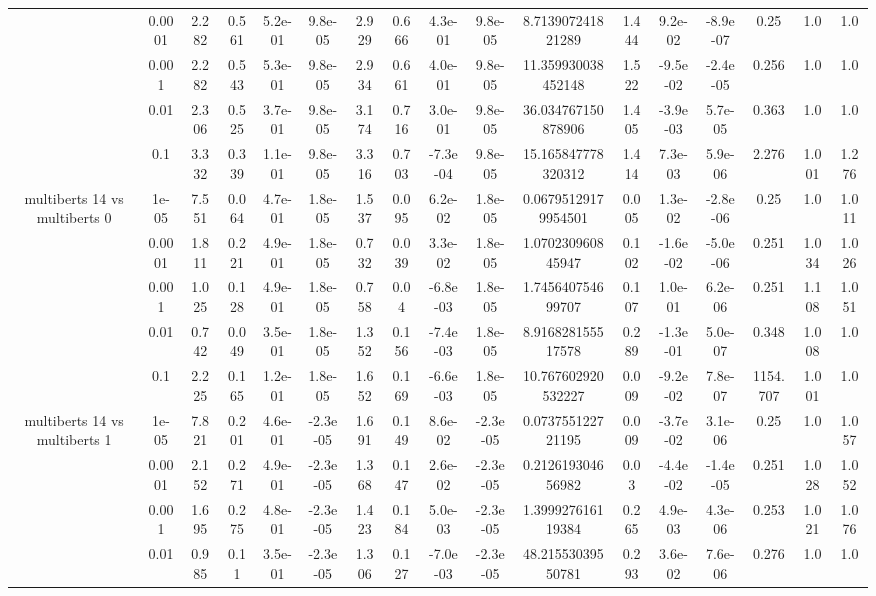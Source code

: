 \begin{tabular}{|c|c|c|c|c|c|c|c|c|c|c|c|c|c|c|c|c|}
 & 0.0001 & 2.282 & 0.561 & 5.2e-01 & 9.8e-05 & 2.929 & 0.666 & 4.3e-01 & 9.8e-05 & 8.713907241821289 & 1.444 & 9.2e-02 & -8.9e-07 & 0.25 & 1.0 & 1.0 \\
 & 0.001 & 2.282 & 0.543 & 5.3e-01 & 9.8e-05 & 2.934 & 0.661 & 4.0e-01 & 9.8e-05 & 11.359930038452148 & 1.522 & -9.5e-02 & -2.4e-05 & 0.256 & 1.0 & 1.0 \\
 & 0.01 & 2.306 & 0.525 & 3.7e-01 & 9.8e-05 & 3.174 & 0.716 & 3.0e-01 & 9.8e-05 & 36.034767150878906 & 1.405 & -3.9e-03 & 5.7e-05 & 0.363 & 1.0 & 1.0 \\
 & 0.1 & 3.332 & 0.339 & 1.1e-01 & 9.8e-05 & 3.316 & 0.703 & -7.3e-04 & 9.8e-05 & 15.165847778320312 & 1.414 & 7.3e-03 & 5.9e-06 & 2.276 & 1.001 & 1.276 \\
\hline
\multirow{5}{*}{multiberts 14 vs multiberts 0} & 1e-05 & 7.551 & 0.064 & 4.7e-01 & 1.8e-05 & 1.537 & 0.095 & 6.2e-02 & 1.8e-05 & 0.06795129179954501 & 0.005 & 1.3e-02 & -2.8e-06 & 0.25 & 1.0 & 1.011 \\
 & 0.0001 & 1.811 & 0.221 & 4.9e-01 & 1.8e-05 & 0.732 & 0.039 & 3.3e-02 & 1.8e-05 & 1.070230960845947 & 0.102 & -1.6e-02 & -5.0e-06 & 0.251 & 1.034 & 1.026 \\
 & 0.001 & 1.025 & 0.128 & 4.9e-01 & 1.8e-05 & 0.758 & 0.04 & -6.8e-03 & 1.8e-05 & 1.745640754699707 & 0.107 & 1.0e-01 & 6.2e-06 & 0.251 & 1.108 & 1.051 \\
 & 0.01 & 0.742 & 0.049 & 3.5e-01 & 1.8e-05 & 1.352 & 0.156 & -7.4e-03 & 1.8e-05 & 8.916828155517578 & 0.289 & -1.3e-01 & 5.0e-07 & 0.348 & 1.008 & 1.0 \\
 & 0.1 & 2.225 & 0.165 & 1.2e-01 & 1.8e-05 & 1.652 & 0.169 & -6.6e-03 & 1.8e-05 & 10.767602920532227 & 0.009 & -9.2e-02 & 7.8e-07 & 1154.707 & 1.001 & 1.0 \\
\hline
\multirow{5}{*}{multiberts 14 vs multiberts 1} & 1e-05 & 7.821 & 0.201 & 4.6e-01 & -2.3e-05 & 1.691 & 0.149 & 8.6e-02 & -2.3e-05 & 0.073755122721195 & 0.009 & -3.7e-02 & 3.1e-06 & 0.25 & 1.0 & 1.057 \\
 & 0.0001 & 2.152 & 0.271 & 4.9e-01 & -2.3e-05 & 1.368 & 0.147 & 2.6e-02 & -2.3e-05 & 0.212619304656982 & 0.03 & -4.4e-02 & -1.4e-05 & 0.251 & 1.028 & 1.052 \\
 & 0.001 & 1.695 & 0.275 & 4.8e-01 & -2.3e-05 & 1.423 & 0.184 & 5.0e-03 & -2.3e-05 & 1.399927616119384 & 0.265 & 4.9e-03 & 4.3e-06 & 0.253 & 1.021 & 1.076 \\
 & 0.01 & 0.985 & 0.11 & 3.5e-01 & -2.3e-05 & 1.306 & 0.127 & -7.0e-03 & -2.3e-05 & 48.21553039550781 & 0.293 & 3.6e-02 & 7.6e-06 & 0.276 & 1.0 & 1.0 \\

\end{tabular}

